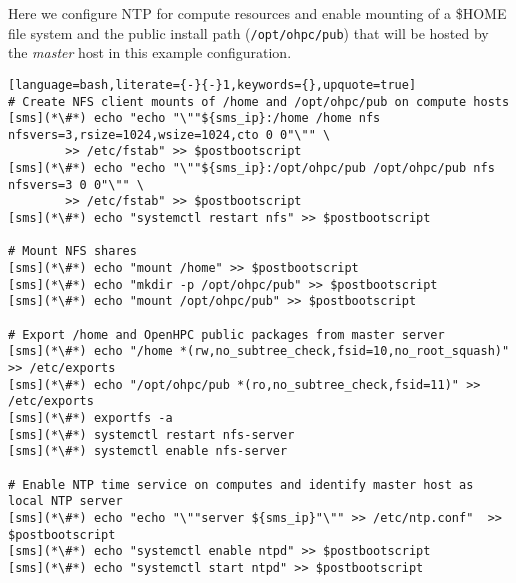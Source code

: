 Here we configure NTP for compute resources and enable \NFS{}  mounting of a
\$HOME file system and the public \OHPC{} install path (\texttt{/opt/ohpc/pub})
that will be hosted by the {\em master} host in this  example configuration.

\vspace*{0.15cm}
\begin{lstlisting}[language=bash,literate={-}{-}1,keywords={},upquote=true]
# Create NFS client mounts of /home and /opt/ohpc/pub on compute hosts
[sms](*\#*) echo "echo "\""${sms_ip}:/home /home nfs nfsvers=3,rsize=1024,wsize=1024,cto 0 0"\"" \
        >> /etc/fstab" >> $postbootscript
[sms](*\#*) echo "echo "\""${sms_ip}:/opt/ohpc/pub /opt/ohpc/pub nfs nfsvers=3 0 0"\"" \
        >> /etc/fstab" >> $postbootscript
[sms](*\#*) echo "systemctl restart nfs" >> $postbootscript

# Mount NFS shares
[sms](*\#*) echo "mount /home" >> $postbootscript
[sms](*\#*) echo "mkdir -p /opt/ohpc/pub" >> $postbootscript
[sms](*\#*) echo "mount /opt/ohpc/pub" >> $postbootscript

# Export /home and OpenHPC public packages from master server
[sms](*\#*) echo "/home *(rw,no_subtree_check,fsid=10,no_root_squash)" >> /etc/exports
[sms](*\#*) echo "/opt/ohpc/pub *(ro,no_subtree_check,fsid=11)" >> /etc/exports
[sms](*\#*) exportfs -a
[sms](*\#*) systemctl restart nfs-server
[sms](*\#*) systemctl enable nfs-server

# Enable NTP time service on computes and identify master host as local NTP server
[sms](*\#*) echo "echo "\""server ${sms_ip}"\"" >> /etc/ntp.conf"  >> $postbootscript
[sms](*\#*) echo "systemctl enable ntpd" >> $postbootscript
[sms](*\#*) echo "systemctl start ntpd" >> $postbootscript

\end{lstlisting}

